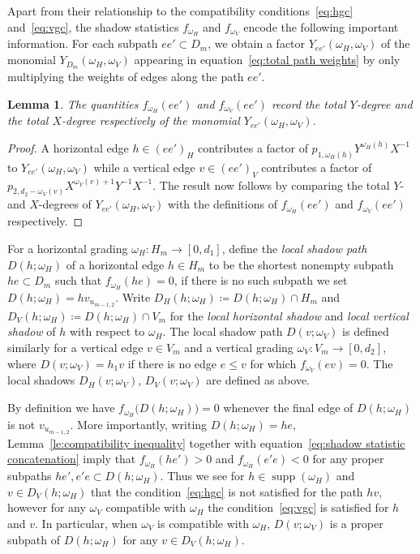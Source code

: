 \documentclass[10pt]{amsart}
\newtheorem{lemma}[theorem]{Lemma}
\theoremstyle{definition}
\DeclareMathOperator{\supp}{supp}
\begin{document}
Apart from their relationship to the compatibility conditions~\eqref{eq:hgc} and~\eqref{eq:vgc}, the shadow statistics $f_{\omega_H}$ and $f_{\omega_V}$ encode the following important information. 
For each subpath $ee'\subset D_m$, we obtain a factor $Y_{ee'}(\omega_H,\omega_V)$ of the monomial $Y_{D_m}(\omega_H,\omega_V)$ appearing in equation~\eqref{eq:total path weights} by only multiplying the weights of edges along the path $ee'$.
\begin{lemma}
 \label{le:shadows and degrees}
 The quantities $f_{\omega_H}(ee')$ and $f_{\omega_V}(ee')$ record the total $Y$-degree and the total $X$-degree respectively of the monomial $Y_{ee'}(\omega_H,\omega_V)$.
\end{lemma}

\begin{proof}
 A horizontal edge $h \in ( e e ' )_{ H}$ contributes a factor of $p _{ 1 , \omega_{ H}  ( h )}  Y^{ \omega_{ H}  ( h ) }X^{ - 1}$  to $Y_{ e e '} ( \omega_{ H} , \omega_{ V} )$ while a vertical edge $v\in(ee')_V$ contributes a factor of\break $p_{2,d_2-\omega_V(v)}X^{\omega_V(v)+1}Y^{-1}X^{-1}$. 
 The result now follows by comparing the total $Y$- and $X$-degrees of $Y_{ee'}(\omega_H,\omega_V)$ with the definitions of $f_{\omega_H}(ee')$ and $f_{\omega_V}(ee')$ respectively.
\end{proof}

For a horizontal grading $\omega_H:H_m\to[0,d_1]$, define the \emph{local shadow path} $D(h;\omega_H)$ of a horizontal edge $h\in H_m$ to be the shortest nonempty subpath $he\subset D_m$ such that $f_{\omega_H}(he)=0$, if there is no such subpath we set $D(h;\omega_H)=hv_{u_{m-1,2}}$. 
Write $D_H(h;\omega_H)\coloneqq D(h;\omega_H)\cap H_m$ and $D_V(h;\omega_H)\coloneqq D(h;\omega_H)\cap V_m$ for the \emph{local horizontal shadow} and \emph{local vertical shadow} of $h$ with respect to $\omega_H$. 
The local shadow path $D(v;\omega_V)$ is defined similarly for a vertical edge $v\in V_m$ and a vertical grading $\omega_V:V_m\to[0,d_2]$, where $D(v;\omega_V)=h_1v$ if there is no edge $e\le v$ for which $f_{\omega_V}(ev)=0$.
The local shadows $D_H(v;\omega_V)$, $D_V(v;\omega_V)$ are defined as above. 

By definition we have $f_{\omega_H}\big(D(h;\omega_H)\big)=0$ whenever the final edge of $D(h;\omega_H)$ is not $v_{u_{m-1,2}}$. 
More importantly, writing $D(h;\omega_H)=he$, Lemma~\ref{le:compatibility inequality} together with equation~\eqref{eq:shadow statistic concatenation} imply that $f_{\omega_H}(he')>0$ and $f_{\omega_H}(e'e)<0$ for any proper subpaths $he',e'e\subset D(h;\omega_H)$. 
Thus we see for $h\in\supp(\omega_H)$ and $v\in D_V(h;\omega_H)$ that the condition~\eqref{eq:hgc} is not satisfied for the path $hv$, however for any $\omega_V$ compatible with $\omega_H$ the condition~\eqref{eq:vgc} is satisfied for $h$ and $v$. 
In particular, when $\omega_V$ is compatible with $\omega_H$, $D(v;\omega_V)$ is a proper subpath of $D(h;\omega_H)$ for any $v\in D_V(h;\omega_H)$.
\end{document}
